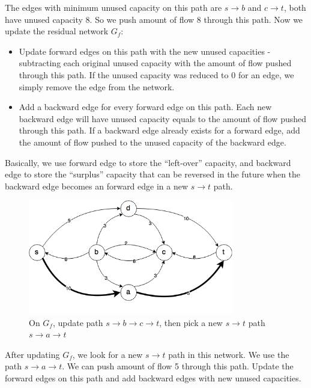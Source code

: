 \documentclass{article}
\begin{document}
The edges with minimum unused capacity on this path are $s \rightarrow b$
and $c \rightarrow t$, both have unused capacity 8. So we push amount of
flow 8 through this path.
Now we update the residual network $G_f$:
\begin{itemize}
\item Update forward edges on this path with the new unused capacities
- subtracting each original unused capacity with the amount of flow 
pushed through this path. If the unused capacity was reduced to 0 for an edge,
we simply remove the edge from the network. 
\item Add a backward edge for every forward edge on this path.
Each new backward edge will have unused capacity equals to the amount of
flow pushed through this path. If a backward edge already exists for a
forward edge, add the amount of flow pushed to the unused capacity of the
backward edge.
\end{itemize} 
Basically, we use forward edge to store the ``left-over'' capacity,
and backward edge to store the ``surplus'' capacity that can be
reversed in the future when the backward edge becomes an forward edge in
a new $s \rightarrow t$ path.

\begin{figure}[H]
\centering
\includegraphics[width=0.8\textwidth]{gf_1.png}
\caption{On $G_f$, update path $s \rightarrow b \rightarrow c \rightarrow t$, then pick a new $s \rightarrow t$ path
$s \rightarrow a \rightarrow t$}
\end{figure}

After updating $G_f$, we look for a new $s \rightarrow t$ path in this 
network. We use the path $s \rightarrow a \rightarrow t$.
We can push amount of flow 5 through this path.
Update the forward edges on this path and add backward edges with
new unused capacities.
\end{document}
